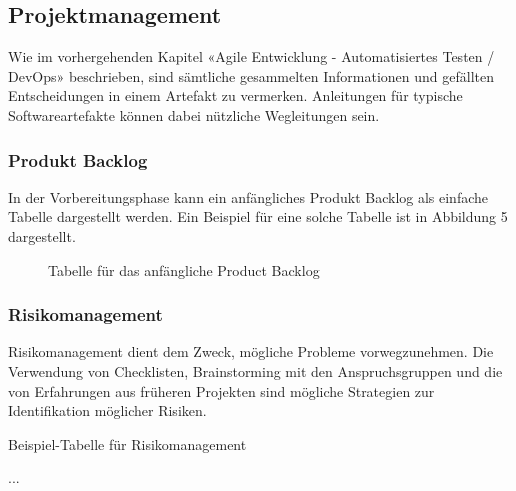 \documentclass[main.tex]{subfiles} %
\begin{document}
\subsection{Projektmanagement}

Wie im vorhergehenden Kapitel «Agile Entwicklung - Automatisiertes Testen / DevOps»
beschrieben, sind sämtliche gesammelten Informationen und gefällten Entscheidungen
in einem Artefakt zu vermerken. Anleitungen für typische Softwareartefakte können
dabei nützliche Wegleitungen sein.

\subsubsection{Produkt Backlog}

In der Vorbereitungsphase kann ein anfängliches Produkt Backlog als einfache Tabelle
dargestellt werden. Ein Beispiel für eine solche Tabelle ist in Abbildung 5 dargestellt.

\begin{figure}[h]
    \centering
    \caption{Tabelle für das anfängliche Product Backlog}
    \label{fig:backlog_table}
\end{figure}


\subsubsection{Risikomanagement}
Risikomanagement dient dem Zweck, mögliche Probleme vorwegzunehmen. Die Verwendung von
Checklisten, Brainstorming mit den Anspruchsgruppen und die von Erfahrungen
aus früheren Projekten sind mögliche Strategien zur Identifikation möglicher Risiken.

\begin{table}[h]
    \centering
    \caption{Beispiel-Tabelle für Risikomanagement}
    ... %
\end{table}
\end{document}
